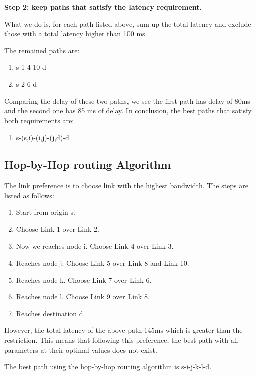 \textbf{Step 2: keep paths that satisfy the latency requirement.}

What we do is, for each path listed above, sum up the total latency and exclude those with a total latency higher than 100 ms.

The remained paths are:
\begin{enumerate}
\item s-1-4-10-d
\item s-2-6-d
\end{enumerate}

Comparing the delay of these two paths, we see the first path has delay of 80ms and the second one has 85 ms of delay. In conclusion, the best paths that satisfy both requirements are:

\begin{enumerate}
\item s-(s,i)-(i,j)-(j,d)-d
\end{enumerate}


\subsection{Hop-by-Hop routing Algorithm}

The link preference is to choose link with the highest bandwidth. The steps are listed as follows:

\begin{enumerate}
\item Start from origin s.
\item Choose Link 1 over Link 2.
\item Now we reaches node i. Choose Link 4 over Link 3.
\item Reaches node j. Choose Link 5 over Link 8 and Link 10.
\item Reaches node k. Choose Link 7 over Link 6.
\item Reaches node l. Choose Link 9 over Link 8.
\item Reaches destination d.
\end{enumerate}

However, the total latency of the above path 145ms which is greater than the restriction. This means that following this preference, the best path with all parameters at their optimal values does not exist.

The best path using the hop-by-hop routing algorithm is s-i-j-k-l-d.











